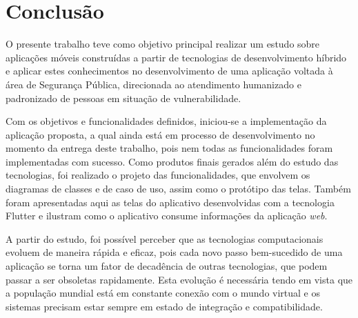 \chapter{Conclusão}\label{ch:conclusao}

O presente trabalho teve como objetivo principal realizar um estudo sobre aplicações móveis construídas a partir de tecnologias de desenvolvimento híbrido e aplicar estes conhecimentos no desenvolvimento de uma aplicação voltada à área de Segurança Pública, direcionada ao atendimento humanizado e padronizado de pessoas em situação de vulnerabilidade.

Com os objetivos e funcionalidades definidos, iniciou-se a implementação da aplicação proposta, a qual ainda está em processo de desenvolvimento no momento da entrega deste trabalho, pois nem todas as funcionalidades foram implementadas com sucesso.
Como produtos finais gerados além do estudo das tecnologias, foi realizado o projeto das funcionalidades, que envolvem os diagramas de classes e de caso de uso, assim como o protótipo das telas.
Também foram apresentadas aqui as telas do aplicativo desenvolvidas com a tecnologia Flutter e ilustram como o aplicativo consume informações da aplicação \textit{web}.


A partir do estudo, foi possível perceber que as tecnologias computacionais evoluem de maneira rápida e eficaz, pois cada novo passo bem-sucedido de uma aplicação se torna um fator de decadência de outras tecnologias, que podem passar a ser obsoletas rapidamente.
Esta evolução é necessária tendo em vista que a população mundial está em constante conexão com o mundo virtual e os sistemas precisam estar sempre em estado de integração e compatibilidade.